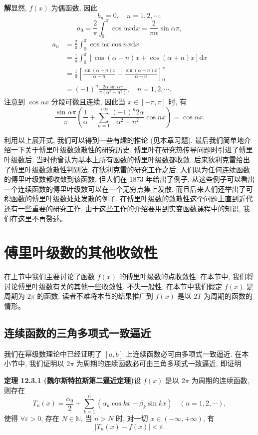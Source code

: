 \documentclass[UTF8,12pt,a4paper,fontset=fandol]{ctexart}
\begin{document}
\noindent\textbf{解}\quad 显然, $f(x)$ 为偶函数, 因此
\[
  b_n=0,\quad n=1,2,\cdots;
\]
\[
  a_0=\frac2\pi\int_0^\pi\cos\alpha x\mathrm dx=\frac{2}{\pi\alpha}\sin\alpha\pi,
\]
\[
\begin{aligned}
  a_n
  &=\frac2\pi\int_0^\pi\cos\alpha x\cos nx\mathrm dx\\
  &=\frac1\pi\int_0^\pi[\cos(\alpha-n)x+\cos(\alpha+n)x]\mathrm dx\\
  &=\frac1\pi\left[
    \frac{\sin(\alpha-n)x}{\alpha-n}
    +\frac{\sin(\alpha+n)x}{\alpha+n}
  \right]_0^\pi\\
  &=(-1)^n\frac{2\alpha\sin\alpha\pi}{\pi(\alpha^2-n^2)},\quad n=1,2,\cdots.
\end{aligned}
\]
注意到 $\cos\alpha x$ 分段可微且连续, 因此当 $x\in[-\pi,\pi]$ 时, 有
\[
  \frac{\sin\alpha\pi}{\pi}\left(
    \frac1\alpha+\sum_{n=1}^{+\infty}\frac{(-1)^n2\alpha}{\alpha^2-n^2}\cos nx
  \right)=\cos\alpha x.
\]

利用以上展开式, 我们可以得到一些有趣的推论 (见本章习题). 最后我们简单地介绍一下关于傅里叶级数敛散性的研究历史. 傅里叶在研究热传导问题时引进了傅里叶级数后, 当时他曾认为基本上所有函数的傅里叶级数都收敛. 后来狄利克雷给出了傅里叶级数敛散性判别法. 在狄利克雷的研究工作之后, 人们以为任何连续函数的傅里叶级数都收敛到该函数, 但人们在 1873 年给出了例子, 从这些例子可以看出一个连续函数的傅里叶级数可以在一个无穷点集上发散, 而且后来人们还举出了可积函数的傅里叶级数处处发散的例子. 在傅里叶级数的敛散性这个问题上直到近代还有一些重要的研究工作, 由于这些工作的介绍要用到实变函数课程中的知识, 我们在这里不再赘述。

\section{傅里叶级数的其他收敛性}

在上节中我们主要讨论了函数 $f(x)$ 的傅里叶级数的点收敛性. 在本节中, 我们将讨论傅里叶级数有关的其他一些收敛性. 不失一般性, 在本节中我们假定 $f(x)$ 是周期为 $2\pi$ 的函数. 读者不难将本节的结果推广到 $f(x)$ 是以 $2T$ 为周期的函数的情形。

\subsection{连续函数的三角多项式一致逼近}

我们在幂级数理论中已经证明了 $[a,b]$ 上连续函数必可由多项式一致逼近. 在本小节中, 我们证明以 $2\pi$ 为周期的连续函数必可由三角多项式一致逼近, 即证明

\noindent\textbf{定理 12.3.1 (魏尔斯特拉斯第二逼近定理)}\quad 设 $f(x)$ 是以 $2\pi$ 为周期的连续函数, 则存在
\[
  T_n(x)=\frac{\alpha_0}{2}+\sum_{k=1}^n(\alpha_k\cos kx+\beta_k\sin kx)\quad(n=1,2,\cdots),
\]
使得 $\forall\varepsilon>0$, 存在 $N\in\mathbb N$, 当 $n>N$ 时, 对一切 $x\in(-\infty,+\infty)$, 有
\[
  |T_n(x)-f(x)|<\varepsilon.
\]
\end{document}
